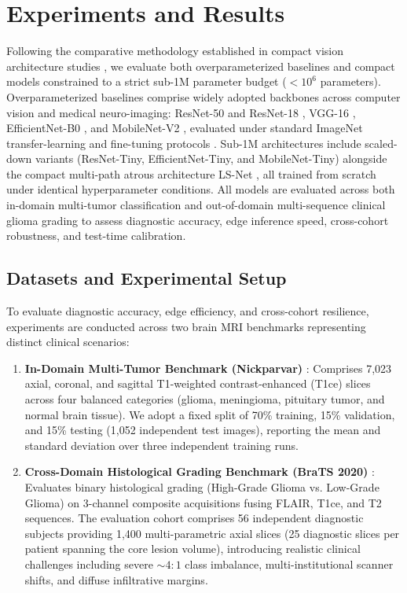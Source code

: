 \section{Experiments and Results}
\label{sec:experiments}

Following the comparative methodology established in compact vision architecture studies \cite{16}, we evaluate both overparameterized baselines and compact models constrained to a strict sub-1M parameter budget ($<10^6$ parameters). Overparameterized baselines comprise widely adopted backbones across computer vision and medical neuro-imaging: ResNet-50 and ResNet-18 \cite{10}, VGG-16 \cite{29}, EfficientNet-B0 \cite{30}, and MobileNet-V2 \cite{27}, evaluated under standard ImageNet transfer-learning and fine-tuning protocols \cite{7, 38, 39}. Sub-1M architectures include scaled-down variants (ResNet-Tiny, EfficientNet-Tiny, and MobileNet-Tiny) alongside the compact multi-path atrous architecture LS-Net \cite{16}, all trained from scratch under identical hyperparameter conditions. All models are evaluated across both in-domain multi-tumor classification and out-of-domain multi-sequence clinical glioma grading to assess diagnostic accuracy, edge inference speed, cross-cohort robustness, and test-time calibration.

\subsection{Datasets and Experimental Setup}

To evaluate diagnostic accuracy, edge efficiency, and cross-cohort resilience, experiments are conducted across two brain MRI benchmarks representing distinct clinical scenarios:
\begin{enumerate}
    \item \textbf{In-Domain Multi-Tumor Benchmark (Nickparvar)} \cite{26}: Comprises 7,023 axial, coronal, and sagittal T1-weighted contrast-enhanced (T1ce) slices across four balanced categories (glioma, meningioma, pituitary tumor, and normal brain tissue). We adopt a fixed split of 70\% training, 15\% validation, and 15\% testing (1,052 independent test images), reporting the mean and standard deviation over three independent training runs.
    \item \textbf{Cross-Domain Histological Grading Benchmark (BraTS 2020)} \cite{2, 23, 45}: Evaluates binary histological grading (High-Grade Glioma vs. Low-Grade Glioma) on 3-channel composite acquisitions fusing FLAIR, T1ce, and T2 sequences. The evaluation cohort comprises 56 independent diagnostic subjects providing 1,400 multi-parametric axial slices (25 diagnostic slices per patient spanning the core lesion volume), introducing realistic clinical challenges including severe $\sim 4:1$ class imbalance, multi-institutional scanner shifts, and diffuse infiltrative margins.
\end{enumerate}

